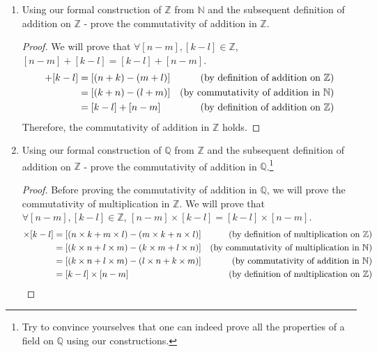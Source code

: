 \documentclass[10pt]{article}
\newcommand{\N}{\mathbb{N}}
\newcommand{\Z}{\mathbb{Z}}
\newcommand{\Q}{\mathbb{Q}}
\newenvironment{problem}[2][Problem]{\begin{trivlist}
\item[\hskip \labelsep {\bfseries #1}\hskip \labelsep {\bfseries #2.}]}{\end{trivlist}}
\begin{document}
\begin{problem}{1}
\begin{enumerate}
\begin{enumerate}
\begin{proof}
                        Therefore, multiplication is well defined in $\N$.
                    \end{proof}



			\end{enumerate}
		\item Using our formal construction of $ \Z $ from $ \N $ and the subsequent definition of addition on $ \Z $ - prove the commutativity of addition in $ \Z $.
            \begin{proof}
                We will prove that $\forall [n - m], [k - l] \in \Z$, $[n - m] + [k - l] = [k - l] + [n - m]$.
                \begin{align*}
                    [n - m] + [k - l] &= [(n + k) - (m + l)] & \text{(by definition of addition on $\Z$)} \hfill \\
                                      &= [(k + n) - (l + m)] & \text{(by commutativity of addition in $\N$)} \hfill \\
                                      &= [k - l] + [n - m] & \text{(by definition of addition on $\Z$)} \hfill
                \end{align*}
                Therefore, the commutativity of addition in $\Z$ holds.
            \end{proof}

		\item Using our formal construction of $ \Q $ from $ \Z $ and the subsequent definition of addition on $ \Z $ - prove the commutativity of addition in $ \Q $.\footnote{Try to convince yourselves that one can indeed prove all the properties of a field on $ \Q $ using our constructions.}
            \begin{proof}
                Before proving the commutativity of addition in $\Q$, we will prove the commutativity of multiplication in $\Z$.
                We will prove that $\forall [n - m], [k - l] \in \Z$, $[n - m] \times [k - l] = [k - l] \times [n - m]$.
                \begin{align*}
                    [n - m] \times [k - l] &= [(n \times k + m \times l) - (m \times k + n \times l)] & \text{(by definition of multiplication on $\Z$)} \hfill \\
                                           &= [(k \times n + l \times m) - (k \times m + l \times n)] & \text{(by commutativity of multiplication in $\N$)} \hfill \\
                                           &= [(k \times n + l \times m) - (l \times n + k \times m)] & \text{(by commutativity of addition in $\N$)} \hfill \\
                                           &= [k - l] \times [n - m] & \text{(by definition of multiplication on $\Z$)} \hfill
                \end{align*}
            \end{proof}


\end{enumerate}
\end{problem}
\end{document}
